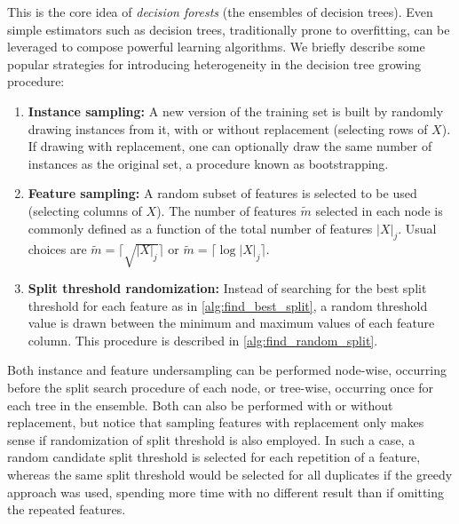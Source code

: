 
%

This is the core idea of \emph{decision forests} (the ensembles of decision trees). Even simple estimators such as decision trees, traditionally prone to overfitting, can be leveraged to compose powerful learning algorithms.
%
We briefly describe some popular strategies for introducing heterogeneity in the decision tree growing procedure:

\begin{enumerate}  %
    \item \textbf{Instance sampling:} A new version of the training set is built by randomly drawing instances from it, with or without replacement (selecting rows of $X$). If drawing with replacement, one can optionally draw the same number of instances as the original set, a procedure known as bootstrapping.
    \item \textbf{Feature sampling:} A random subset of features is selected to be used (selecting columns of $X$). The number of features $\tilde m$ selected in each node is commonly defined as a function of the total number of features $|X|_j$. Usual choices are $\tilde m = \lceil \sqrt{|X|_j} \rceil$ or $\tilde m = \lceil \log |X|_j \rceil$.
    \item \textbf{Split threshold randomization:} Instead of searching for the best split threshold for each feature as in \autoref{alg:find_best_split}, a random threshold value is drawn between the minimum and maximum values of each feature column. This procedure is described in \autoref{alg:find_random_split}.  %
\end{enumerate}
%
Both instance and feature undersampling can be performed node-wise, occurring before the split search procedure of each node, or tree-wise, occurring once for each tree in the ensemble. Both can also be performed with or without replacement, but notice that sampling features with replacement only makes sense if randomization of split threshold is also employed. In such a case, a random candidate split threshold is selected for each repetition of a feature, whereas the same split threshold would be selected for all duplicates if the greedy approach was used, spending more time with no different result than if omitting the repeated features.

